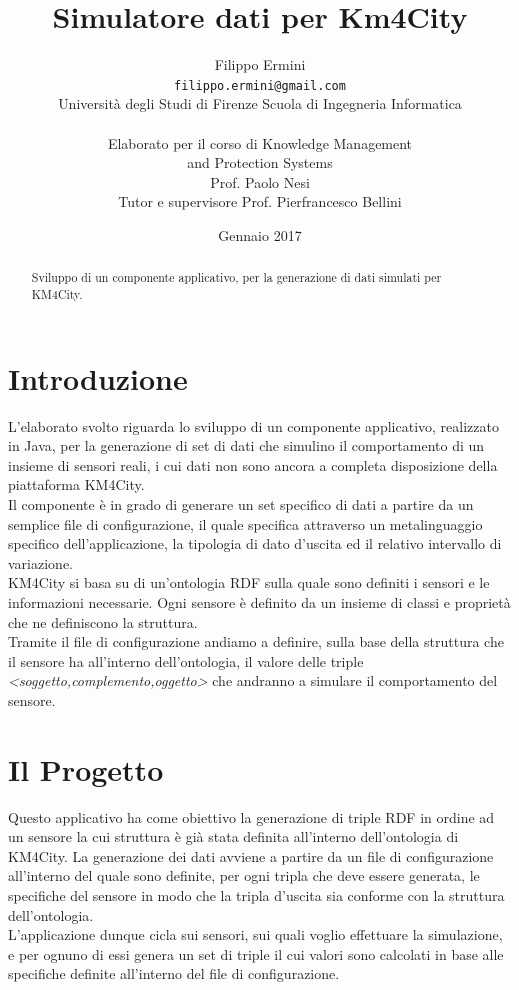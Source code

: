 \documentclass[12pt,a4paper,italian]{article}
\title{\Huge Simulatore dati per Km4City} %
\author{Filippo Ermini\\
	{\tt\small filippo.ermini@gmail.com}\\\small{Università degli Studi di Firenze Scuola di Ingegneria Informatica}\\\\Elaborato per il corso di Knowledge Management \\and Protection Systems\\ Prof. Paolo Nesi\\
	\newline
	\small{Tutor e supervisore Prof. Pierfrancesco Bellini}\\}
\date{Gennaio 2017}
\begin{document}
	\maketitle %
	\thispagestyle{empty}
\begin{abstract}
	Sviluppo di un componente applicativo, per la generazione di dati simulati per KM4City.
\end{abstract}
	\newpage
	\tableofcontents
	\thispagestyle{empty}
	\newpage
	
\section{Introduzione}
\thispagestyle{plain}
L'elaborato svolto riguarda lo sviluppo di un componente applicativo, realizzato in Java, per la generazione di set di dati che simulino il comportamento di un insieme 
di sensori reali, i cui dati non sono ancora a completa disposizione della piattaforma KM4City.\\
Il componente è in grado di generare un set specifico di dati a partire da un semplice file di configurazione, il quale specifica attraverso un metalinguaggio specifico dell'applicazione, 
la tipologia di dato d'uscita ed il relativo intervallo di variazione.\\
KM4City si basa su di un'ontologia RDF sulla quale sono definiti i sensori e le informazioni necessarie. Ogni sensore è definito da un insieme di classi e proprietà che
ne definiscono la struttura.\\
Tramite il file di configurazione andiamo a definire, sulla base della struttura che il sensore ha all'interno dell'ontologia, il valore delle triple \emph{<soggetto,complemento,oggetto>} che andranno
a simulare il comportamento del sensore.

\newpage
\section{Il Progetto}
\thispagestyle{plain}
Questo applicativo ha come obiettivo la generazione di triple RDF in ordine ad un sensore la cui struttura è già stata definita all'interno dell'ontologia di KM4City.
La generazione dei dati avviene a partire da un file di configurazione all'interno del quale sono definite, per ogni tripla che deve essere generata, le specifiche del sensore in modo che 
la tripla d'uscita sia conforme con la struttura dell'ontologia.\\
L'applicazione dunque cicla sui sensori, sui quali voglio effettuare la simulazione, e per ognuno di essi genera un set di triple il cui valori sono calcolati in 
base alle specifiche definite all'interno del file di configurazione.\\
\end{document}
